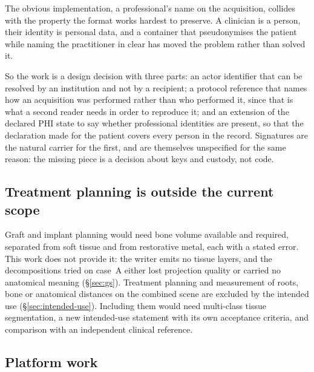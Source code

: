 \documentclass[11pt,a4paper]{article}
\newenvironment{finding}[1]
 {\par\medskip\noindent{\color{uosblue}\rule{\linewidth}{0.9pt}}\par\nobreak\vspace{3pt}
  \noindent{\bfseries\color{uosblue}#1}\par\nobreak\vspace{2pt}}
 {\par\vspace{2pt}\noindent{\color{uosrule}\rule{\linewidth}{0.6pt}}\par\medskip}
\begin{document}
\begin{finding}{Why this cannot simply be a name field}
The obvious implementation, a professional's name on the acquisition, collides with the
property the format works hardest to preserve. A clinician is a person, their identity is
personal data, and a container that pseudonymises the patient while naming the practitioner
in clear has moved the problem rather than solved it.

So the work is a design decision with three parts: an actor identifier that can be resolved
by an institution and not by a recipient; a protocol reference that names how an acquisition
was performed rather than who performed it, since that is what a second reader needs in order
to reproduce it; and an extension of the declared PHI state to say whether professional
identities are present, so that the declaration made for the patient covers every person in
the record. Signatures are the natural carrier for the first, and are themselves
unspecified for the same reason: the missing piece is a decision about keys and custody, not
code.
\end{finding}

\subsection{Treatment planning is outside the current scope}

Graft and implant planning would need bone volume available and required, separated from
soft tissue and from restorative metal, each with a stated error. This work does not provide
it: the writer emits no tissue layers, and the decompositions tried on case~A either lost
projection quality or carried no anatomical meaning (\S\ref{sec:gs}). Treatment planning and measurement of roots, bone or
anatomical distances on the combined scene are excluded by the intended use
(\S\ref{sec:intended-use}). Including them would need multi-class tissue segmentation, a new
intended-use statement with its own acceptance criteria, and comparison with an independent
clinical reference.

\subsection{Platform work}
\end{document}
